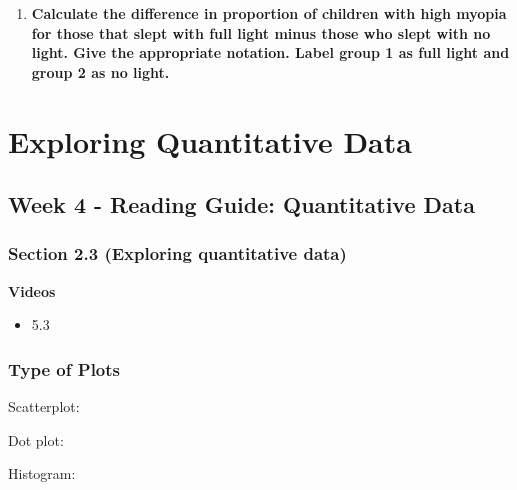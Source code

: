 \documentclass[
]{report}
\providecommand{\tightlist}{%
  \setlength{\itemsep}{0pt}\setlength{\parskip}{0pt}}
\newcommand{\rgs}{\vspace{12pt}} %
\begin{document}
\vspace{0.3in}

\begin{enumerate}
\def\labelenumi{\arabic{enumi}.}
\setcounter{enumi}{13}
\tightlist
\item
  \textbf{Calculate the difference in proportion of children with high myopia for those that slept with full light minus those who slept with no light. Give the appropriate notation. Label group 1 as full light and group 2 as no light.}
\end{enumerate}

\vspace{0.3in}

\hypertarget{exploring-quantitative-data}{%
\chapter{Exploring Quantitative Data}\label{exploring-quantitative-data}}

\hypertarget{week-4---reading-guide-quantitative-data}{%
\section{Week 4 - Reading Guide: Quantitative Data}\label{week-4---reading-guide-quantitative-data}}


\hypertarget{section-2.3-exploring-quantitative-data}{%
\subsection*{Section 2.3 (Exploring quantitative data)}\label{section-2.3-exploring-quantitative-data}}

\textbf{Videos}

\begin{itemize}
\tightlist
\item
  5.3
\end{itemize}

\hypertarget{type-of-plots}{%
\subsection*{Type of Plots}\label{type-of-plots}}

Scatterplot:
\rgs

Dot plot:
\rgs

Histogram:
\rgs
\end{document}
